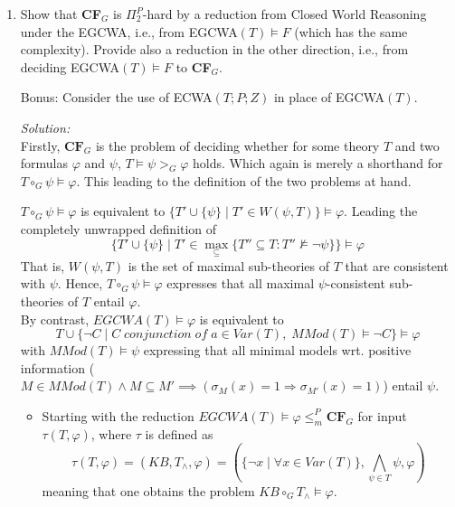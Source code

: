 \documentclass[11pt,a4paper]{article}
\newcommand{\nmodels}{\not\models}
\newcommand{\PiP}[1]{\ensuremath{\Pi^{{P}}_{#1}}\xspace}
\begin{document}
\begin{enumerate}
\newpage

\item Show that {\bf CF}$_G$ is $\PiP{2}$-hard by a reduction from
  Closed World Reasoning under the EGCWA, i.e., from EGCWA$(T)\models F$
  (which has the same complexity). Provide also a reduction in the other
  direction, i.e., from deciding EGCWA$(T)\models F$ to {\bf CF}$_G$.

Bonus: Consider the use of ECWA$(T;P;Z)$ in place of EGCWA$(T)$.\\


\bigskip

\emph{Solution:}\\

Firstly, $\textbf{CF}_G$ is the problem of deciding whether for some theory $T$ and two formulas $\varphi$ and $\psi$, $T\models \psi >_G \varphi$ holds. Which again is merely a shorthand for $T \circ_G \psi \models \varphi$. This leading to the definition of the two problems at hand.

$T \circ_G \psi \models \varphi	$ is equivalent to $ \{T' \cup \{\psi\} \mid T' \in W(\psi,T)\} \models \varphi$. Leading the completely unwrapped definition of 
\begin{equation*}
\{T' \cup \{\psi\} \mid T' \in  \max_{\subseteq}\{ T'' \subseteq T : T'' \nmodels \neg \psi\} \} \models \varphi
\end{equation*}
That is, $W(\psi,T)$ is the set of maximal sub-theories of $T$ that are consistent with $\psi$.
Hence, $T \circ_G \psi \models \varphi	$ expresses that all maximal $\psi$-consistent sub-theories of $T$ entail $\varphi$. \\

By contrast, $\mathit{EGCWA}(T) \models \varphi$ is equivalent to  
\begin{equation*}
T \cup \{\neg C \mid C \mathit{ \; conjunction \; of \; } a \in \mathit{Var}(T) , \;  \mathit{MMod}(T) \models \neg C  \} \models \varphi
\end{equation*}
with $\mathit{MMod}(T) \models \psi$ expressing that all minimal models wrt. positive information ($M \in \mathit{MMod}(T) \land M \subseteq M' \implies (\sigma_M(x)=1 \Rightarrow \sigma_{M'}(x)=1 )$) entail $\psi$.\\


\begin{itemize}


\item Starting with the reduction $\mathit{EGCWA}(T) \models \varphi  \leq_m^P \textbf{CF}_G $ for input $\tau(T,\varphi)$, where $\tau$ is defined as
\begin{equation*}
\tau(T, \varphi)  =  ( \mathit{KB}, T_{\land}, \varphi) = (\{ \neg x \mid \forall x \in \mathit{Var}(T)\}, \bigwedge_{\psi \in T} \psi, \varphi)
\end{equation*}
meaning that one obtains the problem $ \mathit{KB} \circ_G T_{\land} \models \varphi$. \\


\end{itemize}
\end{enumerate}
\end{document}
